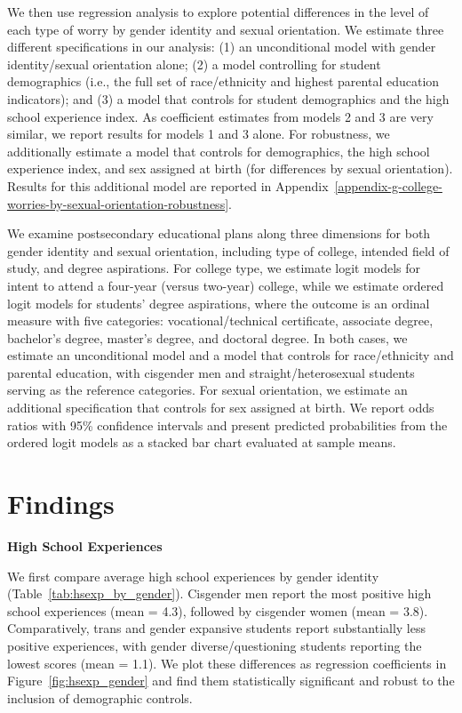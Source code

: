 We then use regression analysis to explore potential differences in the
level of each type of worry by gender identity and sexual orientation.
We estimate three different specifications in our analysis: (1) an
unconditional model with gender identity/sexual orientation alone; (2) a
model controlling for student demographics (i.e., the full set of
race/ethnicity and highest parental education indicators); and (3) a
model that controls for student demographics and the high school
experience index. As coefficient estimates from models 2 and 3 are very
similar, we report results for models 1 and 3 alone. For robustness, we
additionally estimate a model that controls for demographics, the high
school experience index, and sex assigned at birth (for differences by
sexual orientation). Results for this additional model are reported in
Appendix~\ref{appendix-g-college-worries-by-sexual-orientation-robustness}.

We examine postsecondary educational plans along three dimensions for
both gender identity and sexual orientation, including type of college,
intended field of study, and degree aspirations. For college type, we
estimate logit models for intent to attend a four-year (versus two-year)
college, while we estimate ordered logit models for students' degree
aspirations, where the outcome is an ordinal measure with five
categories: vocational/technical certificate, associate degree,
bachelor's degree, master's degree, and doctoral degree. In both cases,
we estimate an unconditional model and a model that controls for
race/ethnicity and parental education, with cisgender men and
straight/heterosexual students serving as the reference categories. For
sexual orientation, we estimate an additional specification that
controls for sex assigned at birth. We report odds ratios with 95\%
confidence intervals and present predicted probabilities from the
ordered logit models as a stacked bar chart evaluated at sample means.

\section{Findings}\label{findings}

\textbf{High School Experiences}

We first compare average high school experiences by gender identity
(Table~\ref{tab:hsexp_by_gender}). Cisgender men report the most positive high school
experiences (mean = 4.3), followed by cisgender women (mean = 3.8).
Comparatively, trans and gender expansive students report substantially
less positive experiences, with gender diverse/questioning students
reporting the lowest scores (mean = 1.1). We plot these differences as
regression coefficients in Figure~\ref{fig:hsexp_gender} and find them statistically
significant and robust to the inclusion of demographic controls.

